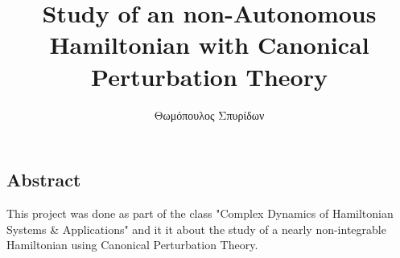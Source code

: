 \documentclass[a4paper,11pt]{book}
\title{Study of an non-Autonomous Hamiltonian with Canonical Perturbation Theory}
\author{Θωμόπουλος Σπυρίδων}
\begin{document}


\begin{changemargin}{2cm}{2cm} 
	\section*{Abstract} 
		This project was done as part of the class "Complex Dynamics of Hamiltonian Systems \& Applications" and it it about the study of a nearly non-integrable Hamiltonian 
		using Canonical Perturbation Theory. 
	\let\cleardoublepage\clearpage
\end{changemargin}




\end{document}
